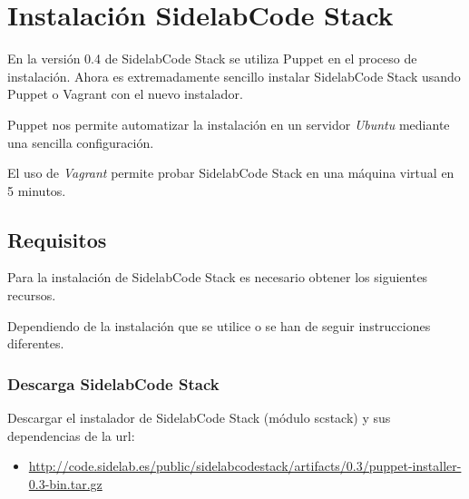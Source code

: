 %
% 

\chapter{Instalación SidelabCode Stack}
\label{app:instalacion-sidelab}

\par En la versión 0.4 de SidelabCode Stack se utiliza Puppet en el proceso de instalación. Ahora es extremadamente sencillo instalar SidelabCode Stack usando Puppet o Vagrant con el nuevo instalador.

\par Puppet nos permite automatizar la instalación en un servidor \emph{Ubuntu} mediante una sencilla configuración.

\par El uso de \emph{Vagrant} permite probar SidelabCode Stack en una máquina virtual en 5 minutos.

\section{Requisitos}
\label{sec:requisitos}

\par Para la instalación de SidelabCode Stack es necesario obtener los siguientes recursos.

\par Dependiendo de la instalación que se utilice  o  se han de seguir instrucciones diferentes.

\subsection{Descarga SidelabCode Stack}
\label{sub:descarga}

\par Descargar el instalador de SidelabCode Stack (módulo scstack) y sus dependencias de la url:

\begin{itemize}
	\item \url{http://code.sidelab.es/public/sidelabcodestack/artifacts/0.3/puppet-installer-0.3-bin.tar.gz}
\end{itemize}

